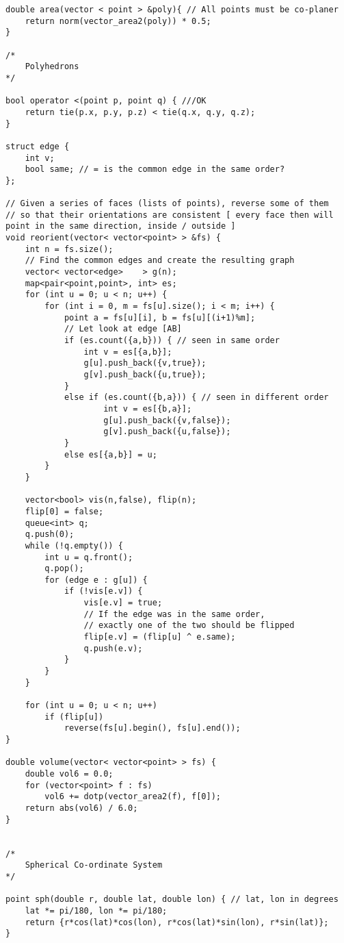 \documentclass[10pt,a4paper,onesided]{article}
\begin{document}
\begin{multicols*}{3}
\begin{lstlisting}
double area(vector < point > &poly){ // All points must be co-planer
    return norm(vector_area2(poly)) * 0.5;
}

/*
    Polyhedrons
*/

bool operator <(point p, point q) { ///OK
    return tie(p.x, p.y, p.z) < tie(q.x, q.y, q.z);
}

struct edge {
    int v;
    bool same; // = is the common edge in the same order?
};

// Given a series of faces (lists of points), reverse some of them
// so that their orientations are consistent [ every face then will point in the same direction, inside / outside ]
void reorient(vector< vector<point> > &fs) {
    int n = fs.size();
    // Find the common edges and create the resulting graph
    vector< vector<edge>    > g(n);
    map<pair<point,point>, int> es;
    for (int u = 0; u < n; u++) {
        for (int i = 0, m = fs[u].size(); i < m; i++) {
            point a = fs[u][i], b = fs[u][(i+1)%m];
            // Let look at edge [AB]
            if (es.count({a,b})) { // seen in same order
                int v = es[{a,b}];
                g[u].push_back({v,true});
                g[v].push_back({u,true});
            }
            else if (es.count({b,a})) { // seen in different order
                    int v = es[{b,a}];
                    g[u].push_back({v,false});
                    g[v].push_back({u,false});
            }
            else es[{a,b}] = u;
        }
    }

    vector<bool> vis(n,false), flip(n);
    flip[0] = false;
    queue<int> q;
    q.push(0);
    while (!q.empty()) {
        int u = q.front();
        q.pop();
        for (edge e : g[u]) {
            if (!vis[e.v]) {
                vis[e.v] = true;
                // If the edge was in the same order,
                // exactly one of the two should be flipped
                flip[e.v] = (flip[u] ^ e.same);
                q.push(e.v);
            }
        }
    }

    for (int u = 0; u < n; u++)
        if (flip[u])
            reverse(fs[u].begin(), fs[u].end());
}

double volume(vector< vector<point> > fs) {
    double vol6 = 0.0;
    for (vector<point> f : fs)
        vol6 += dotp(vector_area2(f), f[0]);
    return abs(vol6) / 6.0;
}


/*
    Spherical Co-ordinate System
*/

point sph(double r, double lat, double lon) { // lat, lon in degrees
    lat *= pi/180, lon *= pi/180;
    return {r*cos(lat)*cos(lon), r*cos(lat)*sin(lon), r*sin(lat)};
}


\end{lstlisting}
\end{multicols*}
\end{document}
